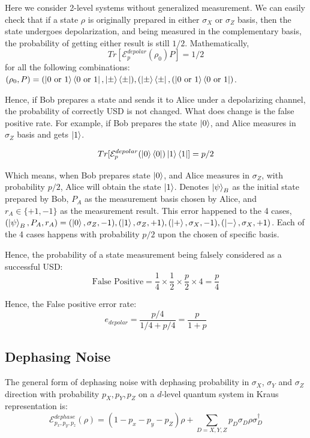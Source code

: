 \documentclass[%
 reprint,
superscriptaddress,
 amsmath,amssymb,
 aps,
]{revtex4-2}
\begin{document}
Here we consider 2-level systems without generalized measurement. We can easily check that if a state $\rho$ is originally prepared in either $\sigma_X$ or $\sigma_Z$ basis, then the state undergoes depolarization, and being measured in the complementary basis, the probability of getting either result is still $1/2$. Mathematically, 
\begin{equation}
    Tr[\mathcal{E}^{depolar}_p(\rho_0)P]=1/2
\end{equation}
for all the following combinations: $(\rho_0, P)=(\ket{0\text{ or }1}\bra{0\text{ or }1}, \ket{\pm}\bra{\pm}), (\ket{\pm}\bra{\pm}, (\ket{0\text{ or }1}\bra{0\text{ or }1})$.

Hence, if Bob prepares a state and sends it to Alice under a depolarizing channel, the probability of correctly USD is not changed. What does change is the false positive rate. For example, if Bob prepares the state $\ket{0}$, and Alice measures in $\sigma_Z$ basis and gets $\ket{1}$.

\begin{equation}
Tr[\mathcal{E}^{depolar}_p(\ket{0}\bra{0})\ket{1}\bra{1}]=p/2
\end{equation}

Which means, when Bob prepares state $\ket{0}$, and Alice measures in $\sigma_Z$, with probability $p/2$, Alice will obtain the state $\ket{1}$. Denotes $\ket{\psi}_B$ as the initial state prepared by Bob, $P_A$ as the measurement basis chosen by Alice, and $r_A\in\{+1, -1\}$ as the measurement result. This error happened to the 4 cases, $\left(\ket{\psi}_B, P_A, r_A\right)=(\ket{0},\sigma_Z, -1), (\ket{1},\sigma_Z, +1), (\ket{+},\sigma_X, -1), (\ket{-},\sigma_X, +1)$. Each of the 4 cases happens with probability $p/2$ upon the chosen of specific basis.

Hence, the probability of a state measurement being falsely considered as a successful USD:
\begin{equation}
    \text{False Positive}=\frac{1}{4}\times\frac{1}{2}\times\frac{p}{2}\times4 = \frac{p}{4}
\end{equation}

Hence, the False positive error rate:
\begin{equation}
    e_{depolar}=\frac{p/4}{1/4+p/4}=\frac{p}{1+p}
\end{equation}

\subsection{Dephasing Noise}
The general form of dephasing noise with dephasing probability in $\sigma_X$, $\sigma_Y$ and $\sigma_Z$ direction with probability $p_X, p_Y, p_Z$ on a $d$-level quantum system in Kraus representation is:
\begin{equation}
    \mathcal{E}^{dephase}_{p_x, p_y, p_z}(\rho)=(1-p_x-p_y-p_Z)\rho+\sum_{D=X, Y, Z}p_D\sigma_D\rho\sigma_D^\dagger
\end{equation}
\end{document}
